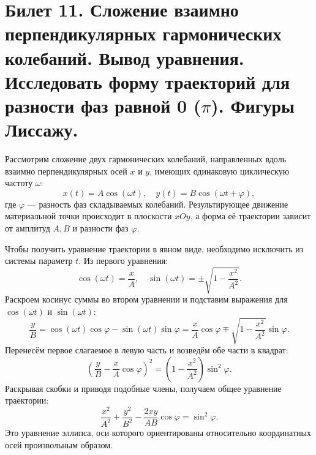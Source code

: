\section{Билет 11. Сложение взаимно перпендикулярных гармонических колебаний. Вывод уравнения. Исследовать форму траекторий для разности фаз равной 0 ($\pi$). Фигуры Лиссажу.}

\begin{definition}
Рассмотрим сложение двух гармонических колебаний, направленных вдоль взаимно перпендикулярных осей $x$ и $y$, имеющих одинаковую циклическую частоту $\omega$:
\begin{equation}
    x(t) = A \cos(\omega t), \quad y(t) = B \cos(\omega t + \varphi),
\end{equation}
где $\varphi$ --- разность фаз складываемых колебаний. Результирующее движение материальной точки происходит в плоскости $xOy$, а форма её траектории зависит от амплитуд $A, B$ и разности фаз $\varphi$.
\end{definition}

\begin{theorem}
Чтобы получить уравнение траектории в явном виде, необходимо исключить из системы параметр $t$. Из первого уравнения:
\begin{equation}
    \cos(\omega t) = \frac{x}{A}, \quad \sin(\omega t) = \pm\sqrt{1 - \frac{x^2}{A^2}}.
\end{equation}
Раскроем косинус суммы во втором уравнении и подставим выражения для $\cos(\omega t)$ и $\sin(\omega t)$:
\begin{equation}
    \frac{y}{B} = \cos(\omega t)\cos\varphi - \sin(\omega t)\sin\varphi = \frac{x}{A}\cos\varphi \mp \sqrt{1 - \frac{x^2}{A^2}}\sin\varphi.
\end{equation}
Перенесём первое слагаемое в левую часть и возведём обе части в квадрат:
\begin{equation}
    \left(\frac{y}{B} - \frac{x}{A}\cos\varphi\right)^2 = \left(1 - \frac{x^2}{A^2}\right)\sin^2\varphi.
\end{equation}
Раскрывая скобки и приводя подобные члены, получаем общее уравнение траектории:
\begin{equation}
    \frac{x^2}{A^2} + \frac{y^2}{B^2} - \frac{2xy}{AB}\cos\varphi = \sin^2\varphi. \label{eq:trajectory_general}
\end{equation}
Это уравнение эллипса, оси которого ориентированы относительно координатных осей произвольным образом.
\end{theorem}

